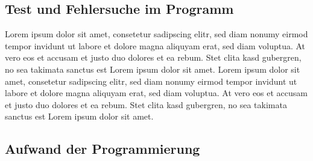 \subsection{Test und Fehlersuche im Programm}
\label{debuggen_mit_hoeherer schicht}
Lorem ipsum dolor sit amet, consetetur sadipscing elitr, sed diam nonumy eirmod tempor invidunt ut labore et dolore magna aliquyam erat, sed diam voluptua. At vero eos et accusam et justo duo dolores et ea rebum. Stet clita kasd gubergren, no sea takimata sanctus est Lorem ipsum dolor sit amet. Lorem ipsum dolor sit amet, consetetur sadipscing elitr, sed diam nonumy eirmod tempor invidunt ut labore et dolore magna aliquyam erat, sed diam voluptua. At vero eos et accusam et justo duo dolores et ea rebum. Stet clita kasd gubergren, no sea takimata sanctus est Lorem ipsum dolor sit amet.

\subsection{Aufwand der Programmierung}
\label{eigene_api_aufwand}